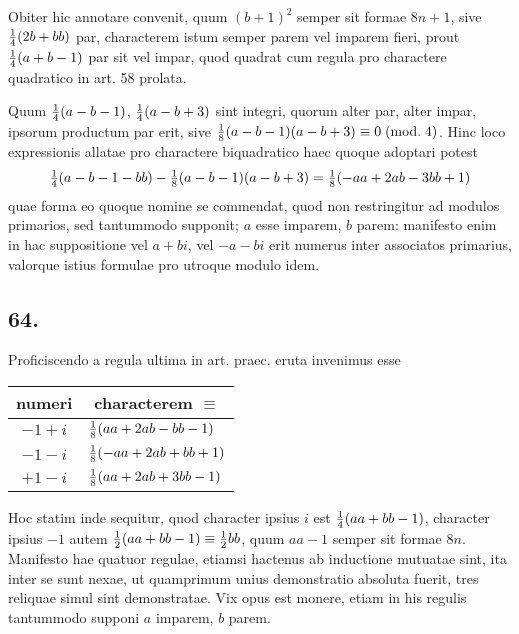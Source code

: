 \documentclass[twoside,12pt, showframe]{memoir}
\renewcommand{\pmod}[1]{\;(\textrm{mod.}\;#1)}
\let\oldfrac\frac
\def\frac#1#2{\mathchoice{\tfrac{#1}{#2}}{\oldfrac{#1}{#2}}{\genfrac{}{}{}{2}{#1}{#2\mathstrut}}{\genfrac{}{}{}{3}{#1}{#2\mathstrut}}}
\begin{document}
Obiter hic annotare convenit, quum \((b+1)^{2}\) semper sit formae \(8 n+1\), sive \(\frac{1}{4}(2 b+b b)\) par, characterem istum semper parem vel imparem fieri, prout \(\frac{1}{4}(a+b-1)\) par sit vel impar, quod quadrat cum regula pro charactere quadratico in art. 58 prolata.
 
Quum \(\frac{1}{4}(a-b-1)\), \( \frac{1}{4}(a-b+3)\) sint integri, quorum alter par, alter impar, ipsorum productum par erit, sive \(\frac{1}{8}(a-b-1)(a-b+3) \equiv 0\pmod{4}\). Hinc loco expressionis allatae pro charactere biquadratico haec quoque adoptari potest
\[\frac{1}{4}(a-b-1-b b)-\frac{1}{8}(a-b-1)(a-b+3)=\frac{1}{8}(-a a+2 a b-3 b b+1)\]
quae forma eo quoque nomine se commendat, quod non restringitur ad modulos primarios, sed tantummodo supponit; \(a\) esse imparem, \(b\) parem: manifesto enim in hac suppositione vel \(a+b i\), vel \(-a-b i\) erit numerus inter associatos primarius, valorque istius formulae pro utroque modulo idem.\clearpage\noindent%

\subsection*{64.}
 
Proficiscendo a regula ultima in art. praec. eruta invenimus esse
\begin{center}
\begin{tabular}{c|l}
numeri &\multicolumn{1}{c}{ characterem \(\equiv\)} \\
\hline
\(-1+i\) & \(\frac{1}{8}(a a+2 a b-b b-1)\) \\
\(-1-i\) & \(\frac{1}{8}(-a a+2 a b+b b+1)\) \\
\(+1-i\) & \(\frac{1}{8}(a a+2 a b+3 b b-1)\) \\
\end{tabular}
\end{center}
Hoc statim inde sequitur, quod character ipsius \(i\) est \(\frac{1}{4}(a a+b b-1)\), character ipsius \(-1\) autem \(\frac{1}{2}(a a+b b-1) \equiv \frac{1}{2} b b\), quum \(a a-1\) semper sit formae \(8 n\). Manifesto hae quatuor regulae, etiamsi hactenus ab inductione mutuatae sint, ita inter se sunt nexae, ut quamprimum unius demonstratio absoluta fuerit, tres reliquae simul sint demonstratae. Vix opus est monere, etiam in his regulis tantummodo supponi \(a\) imparem, \(b\) parem.
\end{document}
